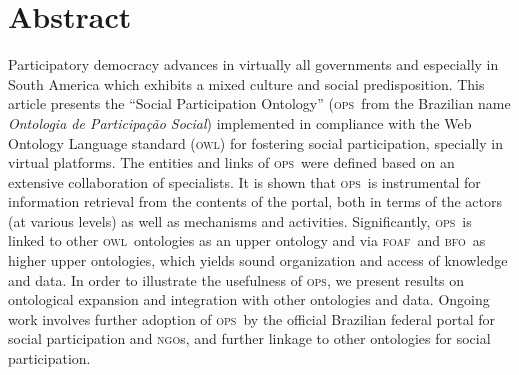 \documentclass[10pt,letterpaper]{article}
\newcommand{\ops}{\textsc{ops}}
\newcommand{\owl}{\textsc{owl}}
\newcommand{\bfo}{\textsc{bfo}}
\newcommand{\foaf}{\textsc{foaf}}
\newcommand{\ngo}{\textsc{ngo}}
\begin{document}
\section*{Abstract}
    Participatory democracy advances in virtually all governments and especially in South America
    which exhibits a mixed culture and social predisposition.
    This article presents the ``Social Participation Ontology'' 
    (\ops\ from the Brazilian name \emph{Ontologia de Participa\c{c}\~ao Social})
    implemented in compliance with the Web Ontology Language standard (\owl)
    for fostering social participation, specially in virtual platforms.
    The entities and links of \ops\ were defined based on an extensive collaboration of specialists.
    It is shown that \ops\ is instrumental for information retrieval from the contents of the portal,
    both in terms of the actors (at various levels) as well as mechanisms and activities.
    Significantly, \ops\ is linked to other \owl\ ontologies as an upper ontology
    and via \foaf\ and \bfo\ as higher upper ontologies,
    which yields sound organization and access of knowledge and data.
    In order to illustrate the usefulness of \ops, we present results on ontological expansion
    and integration with other ontologies and data.
    Ongoing work involves further adoption of \ops\ by the official
    Brazilian federal portal for social participation and \ngo s,
    and further linkage to other ontologies for social participation.
%
\linenumbers
\end{document}
